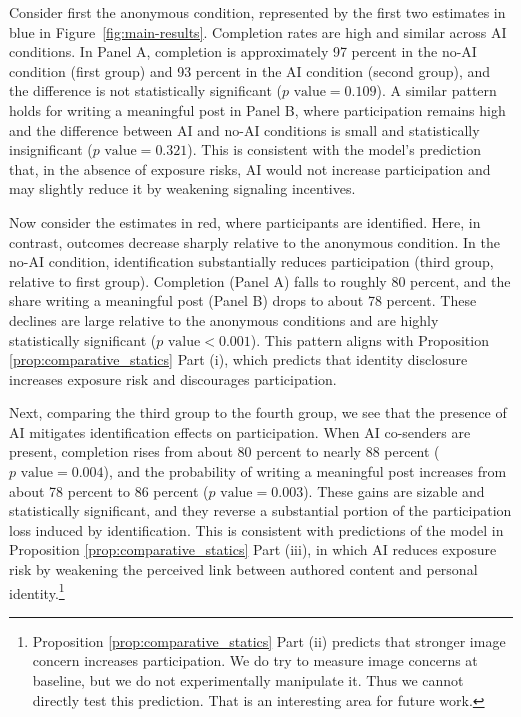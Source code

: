 \documentclass[12pt,notitlepage]{article}
\theoremstyle{plain}
\theoremstyle{plain}
\theoremstyle{definition}
\theoremstyle{definition}
\theoremstyle{assumption}
\theoremstyle{plain}
\theoremstyle{plain}
\theoremstyle{plain}
\theoremstyle{plain}
\theoremstyle{definition}%
\theoremstyle{plain}
\theoremstyle{plain}
\theoremstyle{plain}
\theoremstyle{plain}
\begin{document}
Consider first the anonymous condition, represented by the first two estimates in blue in Figure~\ref{fig:main-results}.  Completion rates are high and similar across AI conditions. In Panel A, completion is approximately 97 percent in the no-AI condition (first group) and 93 percent in the AI condition (second group), and the difference is not statistically significant ($p\text{ value} = 0.109$). A similar pattern holds for writing a meaningful post in Panel B, where participation remains high and the difference between AI and no-AI conditions is small and statistically insignificant ($p\text{ value} = 0.321$). This is consistent with the model's prediction that, in the absence of exposure risks, AI would not increase participation and may slightly reduce it by weakening signaling incentives.

Now consider the estimates in red, where participants are identified. Here, in contrast, outcomes decrease sharply relative to the anonymous condition. In the no-AI condition, identification substantially reduces participation (third group, relative to first group). Completion (Panel A) falls to roughly 80 percent, and the share writing a meaningful post (Panel B) drops to about 78 percent. These declines are large relative to the anonymous conditions and are highly statistically significant ($p\text{ value} < 0.001$). This pattern aligns with Proposition \ref{prop:comparative_statics} Part (i), which predicts that identity disclosure increases exposure risk and discourages participation.


Next, comparing the third group to the fourth group, we see that the presence of AI mitigates identification effects on participation. When AI co-senders are present, completion rises from about 80 percent to nearly 88 percent ($p\text{ value} = 0.004$), and the probability of writing a meaningful post increases from about 78 percent to 86 percent ($p\text{ value} = 0.003$). These gains are sizable and statistically significant, and they reverse a substantial portion of the participation loss induced by identification. This is consistent with predictions of the model in Proposition \ref{prop:comparative_statics} Part (iii), in which AI reduces exposure risk by weakening the perceived link between authored content and personal identity.\footnote{Proposition \ref{prop:comparative_statics} Part (ii) predicts that stronger image concern increases participation. We do try to measure image concerns at baseline, but we do not experimentally manipulate it. Thus we cannot directly test this prediction. That is an interesting area for future work.}
\end{document}
